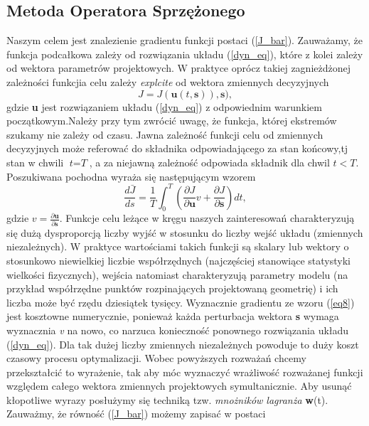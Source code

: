 \documentclass[12pt]{article}
\begin{document}
\subsection{Metoda Operatora Sprzężonego}
Naszym celem jest znalezienie gradientu funkcji postaci (\ref{J_bar}). Zauważamy, że funkcja podcałkowa zależy od rozwiązania układu (\ref{dyn_eq}), które z kolei zależy od wektora parametrów projektowych. W praktyce oprócz takiej zagnieżdżonej zależności funkcjia celu zależy \textit{explcite} od wektora zmiennych decyzyjnych
\begin{equation}
J = J(\textbf{u}(t,\textbf{s})),\textbf{s}),
\label{eq7}
\end{equation}
gdzie \textbf{u} jest rozwiązaniem układu (\ref{dyn_eq}) z odpowiednim warunkiem początkowym.\newline Należy przy tym zwrócić uwagę, że funkcja, której ekstremów szukamy nie zależy od czasu. Jawna zależność funkcji celu od zmiennych decyzyjnych może referować do składnika odpowiadającego za stan końcowy,tj  stan w chwili $\textit{t} = \textit{T}$, a za niejawną zależność odpowiada składnik dla chwil $\textit{t} < \textit{T}.$  \newline
Poszukiwana pochodna wyraża się następującym wzorem
\begin{equation}
\frac{d\bar{J}}{ds} = \frac{1}{T}\int_{0}^{T}(\frac{\partial{J}}{\partial \textbf{u}}v+\frac{\partial{J}}{\partial \textbf{s}})dt,
\label{eq8}
\end{equation}
gdzie $v = \frac{\partial\textbf{u}}{\partial \textbf{s}}.$ Funkcje celu leżące w kręgu naszych zainteresowań charakteryzują się dużą dysproporcją liczby wyjść w stosunku do liczby wejść układu (zmiennych niezależnych). W praktyce wartościami takich funkcji są skalary lub wektory o stosunkowo niewielkiej liczbie współrzędnych (najczęściej stanowiące statystyki wielkości fizycznych), wejścia natomiast charakteryzują parametry modelu (na przykład współrzędne punktów rozpinających projektowaną geometrię) i ich liczba może być rzędu dziesiątek tysięcy. Wyznacznie gradientu ze wzoru (\ref{eq8}) jest kosztowne numerycznie, ponieważ każda perturbacja wektora \textbf{s} wymaga wyznacznia \textit{v} na nowo, co narzuca konieczność ponownego rozwiązania układu (\ref{dyn_eq}). Dla tak dużej liczby zmiennych niezależnych powoduje to duży koszt czasowy procesu optymalizacji.\newline 
Wobec powyższych rozważań chcemy przekształcić to wyrażenie, tak aby móc wyznaczyć wrażliwość rozważanej funkcji względem całego wektora zmiennych projektowych symultanicznie. Aby usunąć kłopotliwe wyrazy posłużymy się techniką tzw. \textit{mnożników lagranża} \textbf{w}(t). Zauważmy, że równość (\ref{J_bar}) możemy zapisać w postaci 
\end{document}

